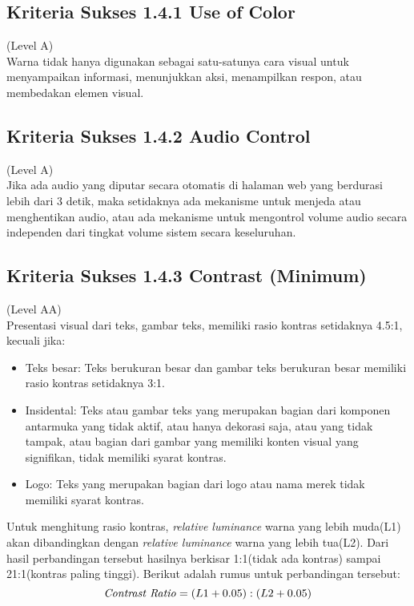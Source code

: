 \subsection{Kriteria Sukses 1.4.1 Use of Color}
\label{subsec:kriteria_1.4.1}
(Level A) \\

Warna tidak hanya digunakan sebagai satu-satunya cara visual untuk menyampaikan informasi, menunjukkan aksi, menampilkan respon, atau membedakan elemen visual.


\subsection{Kriteria Sukses 1.4.2 Audio Control}
\label{subsec:kriteria_1.4.2}
(Level A) \\

Jika ada audio yang diputar secara otomatis di halaman web yang berdurasi lebih dari 3 detik, maka setidaknya ada mekanisme untuk menjeda atau menghentikan audio, atau ada mekanisme untuk mengontrol volume audio secara independen dari tingkat volume sistem secara keseluruhan.


\subsection{Kriteria Sukses 1.4.3 Contrast (Minimum)}
\label{subsec:kriteria_1.4.3}
(Level AA) \\

Presentasi visual dari teks, gambar teks, memiliki rasio kontras setidaknya 4.5:1, kecuali jika:

\begin{itemize}
	\item Teks besar: Teks berukuran besar dan gambar teks berukuran besar memiliki rasio kontras setidaknya 3:1.
	\item Insidental: Teks atau gambar teks yang merupakan bagian dari komponen antarmuka yang tidak aktif, atau hanya dekorasi saja, atau yang tidak tampak, atau bagian dari gambar yang memiliki konten visual yang signifikan, tidak memiliki syarat kontras.
	\item Logo: Teks yang merupakan bagian dari logo atau nama merek tidak memiliki syarat kontras.
\end{itemize}

Untuk menghitung rasio kontras, \textit{relative luminance} warna yang lebih muda(L1) akan dibandingkan dengan \textit{relative luminance} warna yang lebih tua(L2). Dari hasil perbandingan tersebut hasilnya berkisar 1:1(tidak ada kontras) sampai 21:1(kontras paling tinggi). Berikut adalah rumus untuk perbandingan tersebut:
\begin{equation}
\text{\textit{Contrast Ratio}} = (L1 + 0.05) : (L2 +0.05)
\end{equation}

